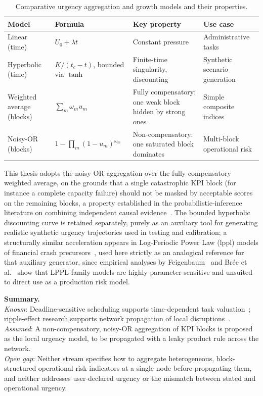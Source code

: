 \begin{table}[H]
\centering
\caption{Comparative urgency aggregation and growth models and their properties.}
\label{tab:urgency_models}
\small
\begin{tabularx}{\linewidth}{>{\raggedright\arraybackslash}p{2.6cm} >{\raggedright\arraybackslash}p{2.6cm} >{\raggedright\arraybackslash}X >{\raggedright\arraybackslash}p{2.4cm}}
\toprule
\textbf{Model} & \textbf{Formula} & \textbf{Key property} & \textbf{Use case} \\
\midrule
Linear (time) & $U_0 + \lambda t$ & Constant pressure & Administrative tasks \\[3pt]
Hyperbolic (time) & $K / (t_c - t)$, bounded via $\tanh$ & Finite-time singularity, discounting & Synthetic scenario generation \\[3pt]
Weighted average (blocks) & $\sum_m \omega_m u_m$ & Fully compensatory: one weak block hidden by strong ones & Simple composite indices \\[3pt]
Noisy-OR (blocks) & $1-\prod_m(1-u_m)^{\omega_m}$ & Non-compensatory: one saturated block dominates & Multi-block operational risk \\
\bottomrule
\end{tabularx}
\end{table}

This thesis adopts the noisy-OR aggregation over the fully compensatory weighted average, on the grounds that a single catastrophic KPI block (for instance a complete capacity failure) should not be masked by acceptable scores on the remaining blocks, a property established in the probabilistic-inference literature on combining independent causal evidence~\autocite{pearl1988probabilistic}. The bounded hyperbolic discounting curve is retained separately, purely as an auxiliary tool for generating realistic synthetic urgency trajectories used in testing and calibration; a structurally similar acceleration appears in Log-Periodic Power Law (\gls{lppl}) models of financial crash precursors~\autocite{johansen2001finite,johansen2000crashes}, used here strictly as an analogical reference for that auxiliary generator, since empirical analyses by Feigenbaum~\autocite{feigenbaum2001statistical} and Br{\'e}e et al.~\autocite{bree2010prediction} show that LPPL-family models are highly parameter-sensitive and unsuited to direct use as a production risk model.

\medskip
\noindent\textbf{Summary.} \\
\textit{Known}: Deadline-sensitive scheduling supports time-dependent task valuation~\autocite{cheng2025survey}; ripple-effect research supports network propagation of local disruptions~\autocite{ivanov2020digital,li2020exploring}. \\
\textit{Assumed}: A non-compensatory, noisy-OR aggregation of KPI blocks is proposed as the local urgency model, to be propagated with a leaky product rule across the network. \\
\textit{Open gap}: Neither stream specifies how to aggregate heterogeneous, block-structured operational risk indicators at a single node before propagating them, and neither addresses user-declared urgency or the mismatch between stated and operational urgency.
